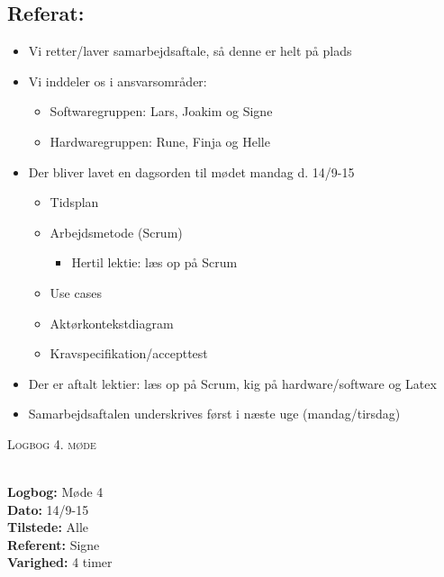 \documentclass[a4paper,11pt,oneside]{memoir}
\begin{document}
\subsection{Referat:}
\begin{itemize}
\item Vi retter/laver samarbejdsaftale, så denne er helt på plads
\item Vi inddeler os i ansvarsområder:
\begin{itemize}
\item Softwaregruppen: Lars, Joakim og Signe
\item Hardwaregruppen: Rune, Finja og Helle
\end{itemize}
\item Der bliver lavet en dagsorden til mødet mandag d. 14/9-15
\begin{itemize}
\item Tidsplan
\item Arbejdsmetode (Scrum)
\begin{itemize}
\item Hertil lektie: læs op på Scrum
\end{itemize}
\item Use cases
\item Aktørkontekstdiagram
\item Kravspecifikation/accepttest
\end{itemize}
\item Der er aftalt lektier: læs op på Scrum, kig på hardware/software og Latex
\item Samarbejdsaftalen underskrives først i næste uge (mandag/tirsdag)
\end{itemize}

\newpage


\begin{center} 
\huge{\textsc{Logbog 4. møde}}
\end{center}

\textbf{ }
\\
\textbf{Logbog:} Møde 4
\\
\textbf{Dato:} 14/9-15
\\
\textbf{Tilstede:} Alle
\\
\textbf{Referent:} Signe
\\
\textbf{Varighed:} 4 timer 
\\
\end{document}

